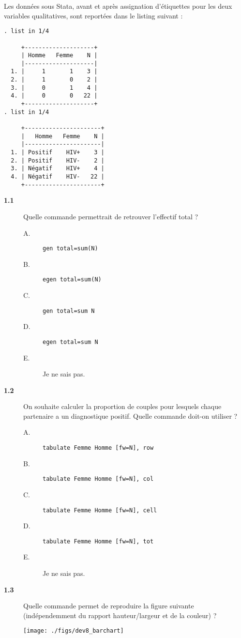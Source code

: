 Les données sous Stata, avant et après assignation d'étiquettes pour les
deux variables qualitatives, sont reportées dans le listing suivant :
\begin{verbatim}
. list in 1/4

     +--------------------+
     | Homme   Femme    N |
     |--------------------|
  1. |     1       1    3 |
  2. |     1       0    2 |
  3. |     0       1    4 |
  4. |     0       0   22 |
     +--------------------+
. list in 1/4

     +----------------------+
     |   Homme   Femme    N |
     |----------------------|
  1. | Positif    HIV+    3 |
  2. | Positif    HIV-    2 |
  3. | Négatif    HIV+    4 |
  4. | Négatif    HIV-   22 |
     +----------------------+
\end{verbatim}
\begin{description}
\item[\bf 1.1] Quelle commande permettrait de retrouver l'effectif total ?
  \begin{description}
  \item[A.] \verb|gen total=sum(N)|
  \item[B.] \verb|egen total=sum(N)|
  \item[C.] \verb|gen total=sum N|
  \item[D.] \verb|egen total=sum N|
  \item[E.] Je ne sais pas.
  \end{description}  
\item[\bf 1.2] On souhaite calculer la proportion de couples pour lesquels
  chaque partenaire a un diagnostique positif. Quelle commande doit-on
  utiliser ?  
  \begin{description}
  \item[A.] \verb|tabulate Femme Homme [fw=N], row|
  \item[B.] \verb|tabulate Femme Homme [fw=N], col|
  \item[C.] \verb|tabulate Femme Homme [fw=N], cell|
  \item[D.] \verb|tabulate Femme Homme [fw=N], tot|
  \item[E.] Je ne sais pas.
  \end{description}  
\item[\bf 1.3] Quelle commande permet de reproduire la figure suivante
  (indépendemment du rapport hauteur/largeur et de la couleur) ?
  \begin{center}
    \texttt{[image: ./figs/dev8\_barchart]}

\end{center}
\end{description}
